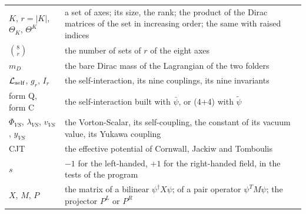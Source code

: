 \documentclass[
  10pt,
]{article}
\begin{document}
\begin{longtable}[]{@{}
  >{\raggedright\arraybackslash}p{}
  >{\raggedright\arraybackslash}p{}@{}}
\(K\), \(r=\lvert K\rvert\), \(\Theta_K\), \(\Theta^K\) & a set of axes;
its size, the rank; the product of the Dirac matrices of the set in
increasing order; the same with raised indices \\
\(\binom8r\) & the number of sets of \(r\) of the eight axes \\
\(m_D\) & the bare Dirac mass of the Lagrangian of the two folders \\
\(\mathcal L_{\rm self}\), \(g_r\), \(I_r\) & the self-interaction, its
nine couplings, its nine invariants \\
form Q, form C & the self-interaction built with \(\bar\psi\), or (4+4)
with \(\tilde\psi\) \\
\(\Phi_{VS}\), \(\lambda_{VS}\), \(v_{VS}\), \(y_{VS}\) & the
Vorton-Scalar, its self-coupling, the constant of its vacuum value, its
Yukawa coupling \\
CJT & the effective potential of Cornwall, Jackiw and Tomboulis \\
\(s\) & \(-1\) for the left-handed, \(+1\) for the right-handed field,
in the tests of the program \\
\(X\), \(M\), \(P\) & the matrix of a bilinear \(\psi^\dagger X\psi\);
of a pair operator \(\psi^TM\psi\); the projector \(P^L\) or \(P^R\) \\
\end{longtable}
\end{document}
